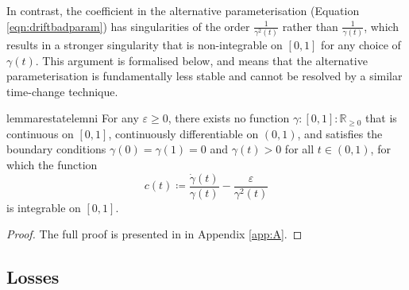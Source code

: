 In contrast, the coefficient in the alternative parameterisation (Equation \ref{eqn:driftbadparam}) has singularities of the order \(\frac{1}{\gamma^{2}(t)}\) rather than \(\frac{1}{\gamma(t)}\), which results in a stronger singularity that is non-integrable on \([0, 1]\) for any choice of \(\gamma(t)\). This argument is formalised below, and means that the alternative parameterisation is fundamentally less stable and cannot be resolved by a similar time-change technique.
\begin{theorembox}
  \begin{restatable}{lemma}{restatelemni}\label{lem:ni}
    For any \(\varepsilon \geq 0\), there exists no function \(\gamma : [0, 1] : \mathbb{R}_{\geq 0}\) that is continuous on \([0,1]\), continuously differentiable on \((0, 1)\), and satisfies the boundary conditions \(\gamma(0) = \gamma(1) = 0\) and \(\gamma(t) > 0\) for all \(t \in (0, 1)\), for which the function
    \[
      c(t) \coloneqq \frac{\dot{\gamma}(t)}{\gamma(t)} - \frac{\varepsilon}{\gamma^{2}(t)}
    \]
    is integrable on \([0, 1]\).
  \end{restatable}
\end{theorembox}
\begin{proof}
  The full proof is presented in  in Appendix \ref{app:A}.
\end{proof}

\subsection{Losses}

